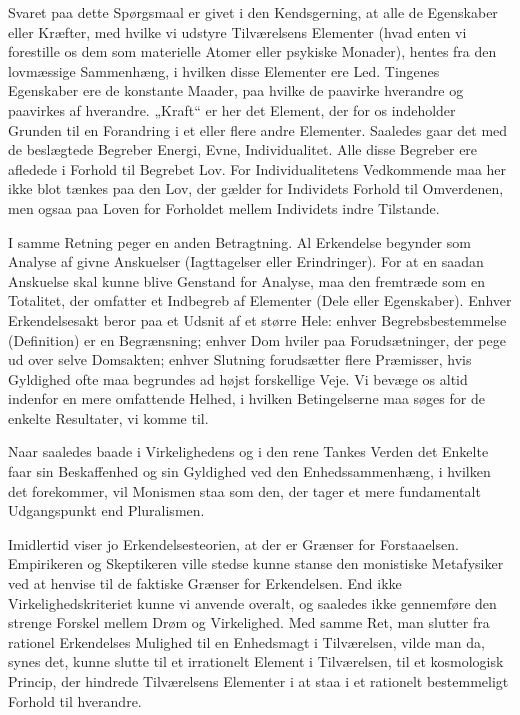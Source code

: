 \documentclass[12pt,a4paper,openany]{book}
\newcommand{\opage}[1]{\marginnote{\footnotesize\textit{[#1]}}}
\begin{document}
Svaret paa dette Spørgsmaal er givet i den Kendsgerning, at alle de Egenskaber
eller Kræfter, med hvilke vi udstyre Tilværelsens Elementer (hvad enten vi
forestille os dem som materielle Atomer eller psykiske Monader), hentes fra den
lovmæssige Sammenhæng, i hvilken disse Elementer ere Led. Tingenes Egenskaber
ere de konstante Maader, paa hvilke de paavirke hverandre og paavirkes af
hverandre. „Kraft“ er her det Element, der for os indeholder Grunden til en
Forandring i et eller flere andre Elementer. Saaledes gaar det med de
beslægtede Begreber Energi, Evne, Individualitet. Alle disse Begreber ere
afledede i Forhold til Begrebet Lov. For Individualitetens Vedkommende maa her
ikke blot tænkes paa den Lov, der gælder
\opage{61}for Individets Forhold til Omverdenen, men ogsaa paa Loven for
Forholdet mellem Individets indre Tilstande.

I samme Retning peger en anden Betragtning. Al Erkendelse begynder som Analyse
af givne Anskuelser (Iagttagelser eller Erindringer). For at en saadan
Anskuelse skal kunne blive Genstand for Analyse, maa den fremtræde som en
Totalitet, der omfatter et Indbegreb af Elementer (Dele eller Egenskaber).
Enhver Erkendelsesakt beror paa et Udsnit af et større Hele: enhver
Begrebsbestemmelse (Definition) er en Begrænsning; enhver Dom hviler paa
Forudsætninger, der pege ud over selve Domsakten; enhver Slutning forudsætter
flere Præmisser, hvis Gyldighed ofte maa begrundes ad højst forskellige Veje.
Vi bevæge os altid indenfor en mere omfattende Helhed, i hvilken Betingelserne
maa søges for de enkelte Resultater, vi komme til.

Naar saaledes baade i Virkelighedens og i den rene Tankes Verden det Enkelte
faar sin Beskaffenhed og sin Gyldighed ved den Enhedssammenhæng, i hvilken det
forekommer, vil Monismen staa som den, der tager et mere fundamentalt
Udgangspunkt end Pluralismen.

Imidlertid viser jo Erkendelsesteorien, at der er Grænser for Forstaaelsen.
Empirikeren og Skeptikeren ville stedse kunne stanse den monistiske Metafysiker
ved at henvise til de faktiske Grænser for Erkendelsen. End ikke
Virkelighedskriteriet kunne vi anvende overalt, og saaledes ikke gennemføre den
strenge Forskel mellem Drøm og Virkelighed. Med samme Ret, man slutter fra
rationel Erkendelses Mulighed til en Enhedsmagt i Tilværelsen, vilde man da,
synes det, kunne slutte til et irrationelt Element i Tilværelsen, til et
kosmologisk Princip, der hindrede Tilværelsens Elementer i at staa i et
rationelt bestemmeligt Forhold til hverandre.
\end{document}
